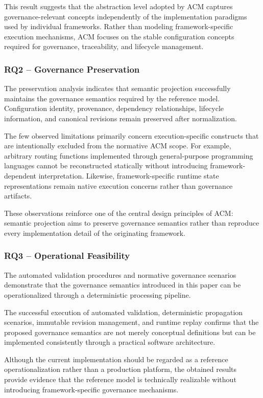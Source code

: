 \documentclass[10pt]{article}
\begin{document}
This result suggests that the abstraction level adopted by ACM captures governance-relevant concepts independently of the implementation paradigms used by individual frameworks. Rather than modeling framework-specific execution mechanisms, ACM focuses on the stable configuration concepts required for governance, traceability, and lifecycle management.

\subsubsection*{RQ2 -- Governance Preservation}

The preservation analysis indicates that semantic projection successfully maintains the governance semantics required by the reference model. Configuration identity, provenance, dependency relationships, lifecycle information, and canonical revisions remain preserved after normalization.

The few observed limitations primarily concern execution-specific constructs that are intentionally excluded from the normative ACM scope. For example, arbitrary routing functions implemented through general-purpose programming languages cannot be reconstructed statically without introducing framework-dependent interpretation. Likewise, framework-specific runtime state representations remain native execution concerns rather than governance artifacts.

These observations reinforce one of the central design principles of ACM: semantic projection aims to preserve governance semantics rather than reproduce every implementation detail of the originating framework.

\subsubsection*{RQ3 -- Operational Feasibility}

The automated validation procedures and normative governance scenarios demonstrate that the governance semantics introduced in this paper can be operationalized through a deterministic processing pipeline.

The successful execution of automated validation, deterministic propagation scenarios, immutable revision management, and runtime replay confirms that the proposed governance semantics are not merely conceptual definitions but can be implemented consistently through a practical software architecture.

Although the current implementation should be regarded as a reference operationalization rather than a production platform, the obtained results provide evidence that the reference model is technically realizable without introducing framework-specific governance mechanisms.
\end{document}

